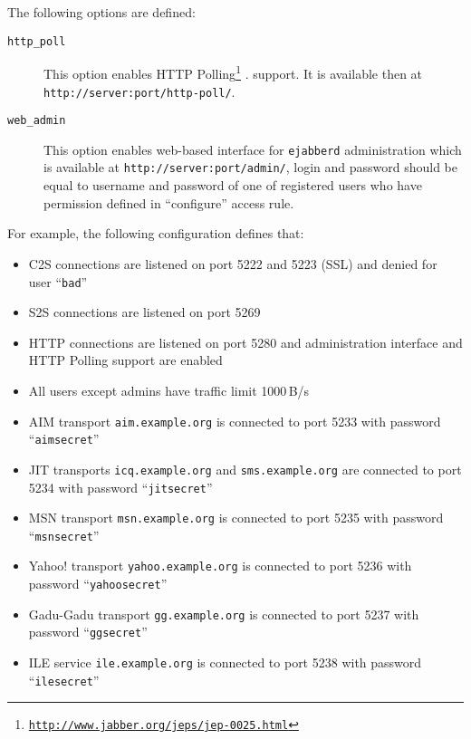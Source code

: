 \documentclass[a4paper,10pt]{article}
\newcommand{\bracehack}{\def\{{\char"7B}\def\}{\char"7D}}
\newcommand{\jid}[1]{\texttt{#1}}
\newcommand{\term}[1]{\texttt{#1}}
\newcommand{\ejabberd}{\texttt{ejabberd}}
\newcommand{\titem}[1]{\item[\bracehack\texttt{#1}]}
\gdef\footahref#1#2{#2\footnote{\href{#1}{\texttt{#1}}}}
\newcommand{\tjepref}[2]{\footahref{http://www.jabber.org/jeps/jep-#1.html}{#2}}
\begin{document}
\begin{description}
  The following options are defined:
  \begin{description}
    \titem{http\_poll} This option enables \tjepref{0025}{HTTP Polling} .
    support.  It is available then at \verb|http://server:port/http-poll/|.
    
    \titem{web\_admin} This option enables web-based interface for \ejabberd{}
    administration which is available at \verb|http://server:port/admin/|,
    login and password should be equal to username and password of one of
    registered users who have permission defined in ``configure'' access rule.
  \end{description}
\end{description}

For example, the following configuration defines that:
\begin{itemize}
\item C2S connections are listened on port 5222 and 5223 (SSL) and denied for
  user ``\term{bad}''
\item S2S connections are listened on port 5269
\item HTTP connections are listened on port 5280 and administration interface
  and HTTP Polling support are enabled
\item All users except admins have traffic limit 1000\,B/s
\item AIM transport \jid{aim.example.org} is connected to port 5233 with
  password ``\term{aimsecret}''
\item JIT transports \jid{icq.example.org} and \jid{sms.example.org} are
  connected to port 5234 with password ``\term{jitsecret}''
\item MSN transport \jid{msn.example.org} is connected to port 5235 with
  password ``\term{msnsecret}''
\item Yahoo! transport \jid{yahoo.example.org} is connected to port 5236 with
  password ``\term{yahoosecret}''
\item Gadu-Gadu transport \jid{gg.example.org} is connected to port 5237 with
  password ``\term{ggsecret}''
\item ILE service \jid{ile.example.org} is connected to port 5238 with
  password ``\term{ilesecret}''
\end{itemize}
\end{document}
